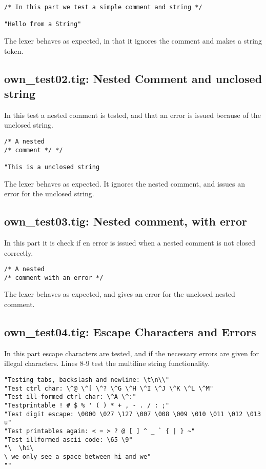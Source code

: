 \documentclass{article}
\begin{document}
\begin{lstlisting}[frame=single]
/* In this part we test a simple comment and string */

"Hello from a String"
\end{lstlisting}

The lexer behaves as expected, in that it ignores the comment and makes a string token.

\subsection{own\_test02.tig: Nested Comment and unclosed string}
In this test a nested comment is tested, and that an error is issued because of the unclosed string.

\begin{lstlisting}[frame=single]
/* A nested
/* comment */ */

"This is a unclosed string
\end{lstlisting}

The lexer behaves as expected. It ignores the nested comment, and issues an error for the unclosed string.

\subsection{own\_test03.tig: Nested comment, with error}
In this part it is check if en error is issued when a nested comment is not closed correctly.

\begin{lstlisting}[frame=single]
/* A nested
/* comment with an error */ 

\end{lstlisting}

The lexer behaves as expected, and gives an error for the unclosed nested comment.

\subsection{own\_test04.tig: Escape Characters and Errors}
In this part escape characters are tested, and if the necessary errors are given for illegal characters.
Lines 8-9 test the multiline string functionality.


\begin{lstlisting}[frame=single]
"Testing tabs, backslash and newline: \t\n\\"
"Test ctrl char: \^@ \^[ \^? \^G \^H \^I \^J \^K \^L \^M"
"Test ill-formed ctrl char: \^A \^:"
"Testprintable ! # $ % ' ( ) * + , - . / : ;"
"Test digit escape: \0000 \027 \127 \007 \008 \009 \010 \011 \012 \013 u"
"Test printables again: < = > ? @ [ ] ^ _ ` { | } ~"
"Test illformed ascii code: \65 \9"
"\	\hi\
\ we only see a space between hi and we"
""
\end{lstlisting}
\end{document}
